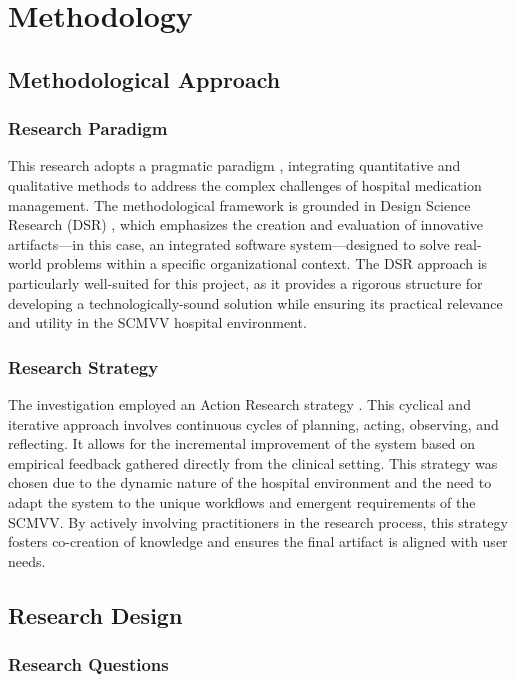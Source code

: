 \chapter{Methodology}

\section{Methodological Approach}

\subsection{Research Paradigm}

This research adopts a pragmatic paradigm \cite{venkatesh2003}, integrating quantitative and qualitative methods to address the complex challenges of hospital medication management. The methodological framework is grounded in Design Science Research (DSR) \cite{martin2017}, which emphasizes the creation and evaluation of innovative artifacts—in this case, an integrated software system—designed to solve real-world problems within a specific organizational context. The DSR approach is particularly well-suited for this project, as it provides a rigorous structure for developing a technologically-sound solution while ensuring its practical relevance and utility in the SCMVV hospital environment.

\subsection{Research Strategy}

The investigation employed an Action Research strategy \cite{greenhalgh2017}. This cyclical and iterative approach involves continuous cycles of planning, acting, observing, and reflecting. It allows for the incremental improvement of the system based on empirical feedback gathered directly from the clinical setting. This strategy was chosen due to the dynamic nature of the hospital environment and the need to adapt the system to the unique workflows and emergent requirements of the SCMVV. By actively involving practitioners in the research process, this strategy fosters co-creation of knowledge and ensures the final artifact is aligned with user needs.

\section{Research Design}

\subsection{Research Questions}

